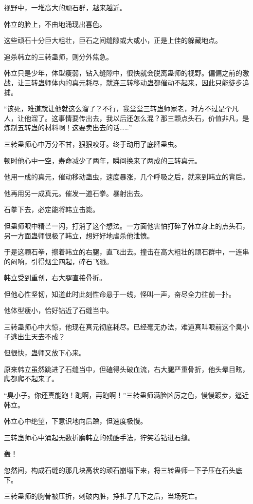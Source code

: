 \begin{this_body}
视野中，一堆高大的顽石群，越来越近。

韩立的脸上，不由地涌现出喜色。

这些顽石十分巨大粗壮，巨石之间缝隙或大或小，正是上佳的躲藏地点。

追杀韩立的三转蛊师，则分外焦急。

韩立只是少年，体型瘦弱，钻入缝隙中，很快就会脱离蛊师的视野。偏偏之前的激战，让三转蛊师体内的真元耗尽，就连三转移动蛊都催动不起来，因此只能徒步追捕。

“该死，难道就让他就这么溜了？不行，我堂堂三转蛊师家老，对方不过是个凡人，让他溜了。这事情要传出去，我以后还怎么混？那三颗点头石，价值非凡，是炼制五转蛊的材料啊！这要卖出去的话……”

三转蛊师心中万分不甘，狠狠咬牙。终于动用了底牌蛊虫。

顿时他心中一空，寿命减少了两年，瞬间换来了两成的三转真元。

他用一成的真元，催动移动蛊虫，速度暴涨，几个呼吸之后，就来到韩立的背后。

他再用另一成真元。催发一道石拳。暴射出去。

石拳下去，必定能将韩立击毙。

但蛊师眼中精芒一闪，打消了这个想法。一方面他害怕打碎了韩立身上的点头石，另一方面蛊师恨极了韩立，想好好地虐杀他泄愤。

于是这颗石拳，擦着韩立的右腿，直飞出去。撞击在高大粗壮的顽石群中，一连串的闷响，引得烟尘四起，碎石飞溅。

韩立受到重创，右大腿直接骨折。

但他心性坚韧，知道此时此刻性命悬于一线，怪叫一声，奋尽全力往前一扑。

他体型瘦小，恰好钻近了石缝当中。

三转蛊师心中大惊，他现在真元彻底耗尽。已经毫无办法，难道真叫眼前这个臭小子逃出生天去不成？

但很快，蛊师又放下心来。

原来韩立虽然跳进了石缝当中，但磕得头破血流，右大腿严重骨折，他头晕目眩，爬都爬不起来了。

“臭小子。你还真能跑！跑啊，再跑啊！”三转蛊师满脸凶厉之色，慢慢踱步，逼近韩立。

韩立心中绝望，下意识地向后蹭，但速度极慢。

三转蛊师心中涌起无数折磨韩立的残酷手法，狞笑着钻进石缝。

轰！

忽然间，构成石缝的那几块高状的顽石崩塌下来，将三转蛊师一下子压在石头底下。

三转蛊师的胸骨被压折，刺破内脏，挣扎了几下之后，当场死亡。


\end{this_body}
